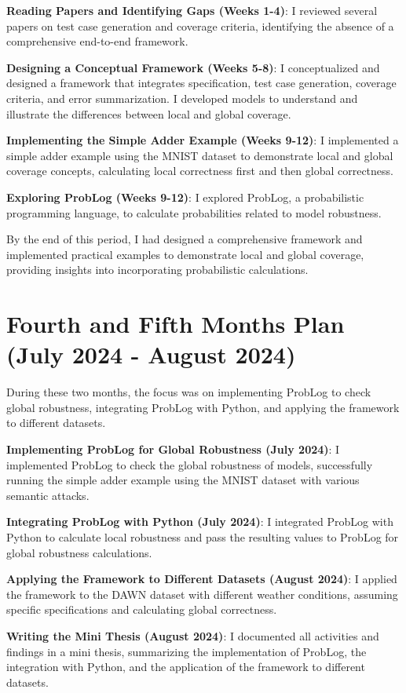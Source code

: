\textbf{Reading Papers and Identifying Gaps (Weeks 1-4)}:
I reviewed several papers on test case generation and coverage criteria, identifying the absence of a comprehensive end-to-end framework.

\textbf{Designing a Conceptual Framework (Weeks 5-8)}:
I conceptualized and designed a framework that integrates specification, test case generation, coverage criteria, and error summarization. I developed models to understand and illustrate the differences between local and global coverage.

\textbf{Implementing the Simple Adder Example (Weeks 9-12)}:
I implemented a simple adder example using the MNIST dataset to demonstrate local and global coverage concepts, calculating local correctness first and then global correctness.

\textbf{Exploring ProbLog (Weeks 9-12)}:
I explored ProbLog, a probabilistic programming language, to calculate probabilities related to model robustness.

By the end of this period, I had designed a comprehensive framework and implemented practical examples to demonstrate local and global coverage, providing insights into incorporating probabilistic calculations.

\section{Fourth and Fifth Months Plan (July 2024 - August 2024)}

During these two months, the focus was on implementing ProbLog to check global robustness, integrating ProbLog with Python, and applying the framework to different datasets.

\textbf{Implementing ProbLog for Global Robustness (July 2024)}:
I implemented ProbLog to check the global robustness of models, successfully running the simple adder example using the MNIST dataset with various semantic attacks.

\textbf{Integrating ProbLog with Python (July 2024)}:
I integrated ProbLog with Python to calculate local robustness and pass the resulting values to ProbLog for global robustness calculations.

\textbf{Applying the Framework to Different Datasets (August 2024)}:
I applied the framework to the DAWN dataset with different weather conditions, assuming specific specifications and calculating global correctness.

\textbf{Writing the Mini Thesis (August 2024)}:
I documented all activities and findings in a mini thesis, summarizing the implementation of ProbLog, the integration with Python, and the application of the framework to different datasets.

